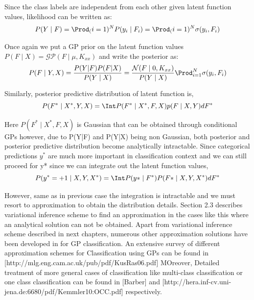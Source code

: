  Since the class labels are independent  from each other given latent function values, likelihood can be written as:
	$$ P(Y \mid F) = \Prod_(i=1)^{N} P(y_i \mid F_i) = \Prod_(i=1)^{N} \sigma(y_i,F_i)$$
	
Once again we put a GP prior on the latent function values $P(F \mid X) = \mathcal{GP}(F \mid \mu, K_{xx})$ and write the posterior as:
\begin{equation}
P(F \mid Y,X) = \frac{P(Y|F)P(F|X)}{P(Y \mid X)} = \frac{\mathcal{N}(F \mid 0, K_{xx})}{P(Y \mid X)}\Prod_{i=1}^{N}\sigma(y_i,F_i)
\end{equation}

Similarly, posterior predictive distribution of latent function is,
\begin{equation}
	P(F^* \mid X^*, Y,X) = \Int P(F^* \mid X^*, F ,X) p(F \mid X,Y) dF^*
\end{equation} 

Here $P(F^* \mid X^*, F ,X)$ is Gaussian that can be obtained through conditional GPs however, due to P(Y|F) and P(Y|X) being non Gaussian, both posterior and posterior predictive distribution become analytically intractable.
Since categorical predictions $y^*$ are much more important in classification context and we can still proceed for y* since we can integrate out the latent function values, 
$$P(y^*=+1 \mid X,Y,X^*) = \Int P(y* \mid F^*)P(F* \mid X,Y,X^*)dF^*$$

However, same as in previous case the integration is intractable and we must resort to approximation to obtain the distribution details. Section 2.3 describes variational inference scheme to find an approximation in the cases like this where an analytical  solution can not be obtained.
Apart from variational inference scheme described in next chapters, numerous other approximation solutions have been developed in for GP classification. An extensive survey of different approximation schemes for Classification using GPs can be found in  [http://mlg.eng.cam.ac.uk/pub/pdf/KusRas06.pdf] MOreover, Detailed treatment of more general cases of classification like multi-class classification or one class classification can be found in [Barber] and [http://hera.inf-cv.uni-jena.de:6680/pdf/Kemmler10:OCC.pdf] respectively.






